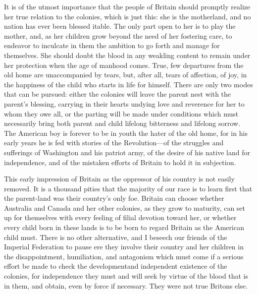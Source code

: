 \documentclass[11pt,openany]{book}
\begin{document}
It is of the utmost importance that the people of Britain should promptly realize her true relation to the colonies, which is just this: she is the motherland, and no nation has ever been blessed itable. The only part open to her is to play the mother, and, as her children grow beyond the need of her fostering care, to endeavor to inculcate in them the ambition to go forth and manage for themselves. She should doubt the blood in any weakling content to remain under her protection when the age of manhood comes. True, few departures from the old home are unaccompanied by tears, but, after all, tears of affection, of joy, in the happiness of the child who starts in life for himself. There are only two modes that can be pursued: either the colonies will leave the parent nest with the parent's blessing, carrying in their hearts undying love and reverence for her to whom they owe all, or the parting will be made under conditions which must necessarily bring both parent and child lifelong bitterness and lifelong sorrow. The American boy is forever to be in youth the hater of the old home, for in his early years he is fed with stories of the Revolution---of the struggles and sufferings of Washington and his patriot army, of the desire of his native land for independence, and of the mistaken efforts of Britain to hold it in subjection.

This early impression of Britain as the oppressor of his country is not easily removed. It is a thousand pities that the majority of our race is to learn first that the parent-land was their country's only foe. Britain can choose whether Australia and Canada and her other colonies, as they grow to maturity, can set up for themselves with every feeling of filial devotion toward her, or whether every child born in these lands is to be born to regard Britain as the American child must. There is no other alternative, and I beseech our friends of the Imperial Federation to pause ere they involve their country and her children in the disappointment, humiliation, and antagonism which must come if a serious effort be made to check the developmentand independent existence of the colonies, for independence they must and will seek by virtue of the blood that is in them, and obtain, even by force if necessary. They were not true Britons else.
\end{document}
